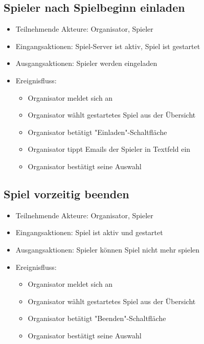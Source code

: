 \documentclass[a4paper]{scrreprt}
\begin{document}
    \subsection{Spieler nach Spielbeginn einladen}
    \begin{itemize}
        \item Teilnehmende Akteure: \Gls{Organisator}, \Gls{Spieler}
        \item Eingangsaktionen: \Gls{Spiel-Server} ist aktiv, \Gls{Spiel} ist gestartet
        \item Ausgangsaktionen: \Gls{Spieler} werden eingeladen
        \item Ereignisfluss:
        \begin{itemize}
            \item \Gls{Organisator} meldet sich an
            \item \Gls{Organisator} wählt gestartetes \Gls{Spiel} aus der Übersicht
            \item \Gls{Organisator} betätigt "Einladen"-Schaltfläche
            \item \Gls{Organisator} tippt Emails der \Gls{Spieler} in Textfeld ein
            \item \Gls{Organisator} bestätigt seine Auswahl
        \end{itemize}
    \end{itemize}

    \subsection{Spiel vorzeitig beenden}
    \begin{itemize}
        \item Teilnehmende Akteure: \Gls{Organisator}, \Gls{Spieler}
        \item Eingangsaktionen: \Gls{Spiel} ist aktiv und gestartet
        \item Ausgangsaktionen: \Gls{Spieler} können \Gls{Spiel} nicht mehr spielen %
        \item Ereignisfluss:
        \begin{itemize}
            \item \Gls{Organisator} meldet sich an
            \item \Gls{Organisator} wählt gestartetes \Gls{Spiel} aus der Übersicht
            \item \Gls{Organisator} betätigt "Beenden"-Schaltfläche
            \item \Gls{Organisator} bestätigt seine Auswahl
        \end{itemize}
    \end{itemize}
\end{document}
